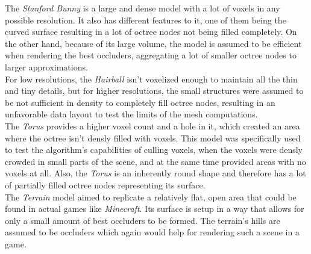 \noindent
The \emph{Stanford Bunny} is a large and dense model with a lot of voxels in any possible resolution.
It also has different features to it, one of them being the curved surface resulting in a lot of octree 
nodes not being filled completely. On the other hand, because of its large volume, the model is assumed 
to be efficient when rendering the best occluders, aggregating a lot of smaller octree nodes to larger 
approximations. \\ 

\noindent
For low resolutions, the \emph{Hairball} isn't voxelized enough to maintain all the thin and tiny details, 
but for higher resolutions, the small structures were assumed to be not sufficient in density to completely
fill octree nodes, resulting in an unfavorable data layout to test the limits of the mesh computations. \\

\noindent
The \emph{Torus} provides a higher voxel count and a hole in it, which created an area where the 
octree isn't densly filled with voxels. This model was specifically used to test the algorithm's 
capabilities of culling voxels, when the voxels were densly crowded in small parts of the scene, and 
at the same time provided areas with no voxels at all. Also, the \emph{Torus} is an inherently round 
shape and therefore has a lot of partially filled octree nodes representing its surface. \\

\noindent
The \emph{Terrain} model aimed to replicate a relatively flat, open area that could be found in actual 
games like \emph{Minecraft}. Its surface is setup in a way that allows for only a small amount of best 
occluders to be formed. The terrain's hills are assumed to be occluders which again would help for rendering 
such a scene in a game.


%
%
%
%
%
%



